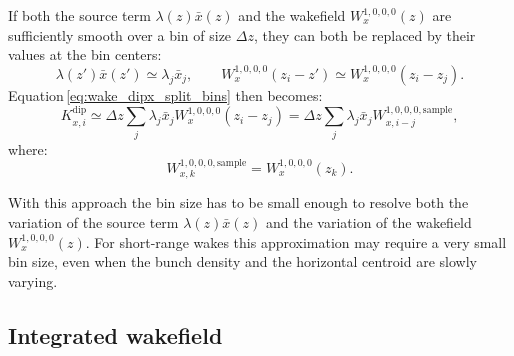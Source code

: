 If both the source term $\lambda(z)\bar{x}(z)$ and the wakefield
$W_x^{1,0,0,0}(z)$ are sufficiently smooth over a bin of size $\Delta z$, they
can both be replaced by their values at the bin centers:
\begin{equation}
    \lambda(z')\bar{x}(z') \simeq \lambda_j\bar{x}_j,\qquad
    W_x^{1,0,0,0}(z_i-z') \simeq W_x^{1,0,0,0}(z_i-z_j).
\end{equation}
Equation\,\eqref{eq:wake_dipx_split_bins} then becomes:
\begin{equation}
    K_{x,i}^\mathrm{dip} \simeq
    \Delta z
    \sum_j
    \lambda_j\bar{x}_j W_x^{1,0,0,0}(z_i-z_j)
    =
    \Delta z
    \sum_j
    \lambda_j\bar{x}_j W_{x,i-j}^{1,0,0,0,\mathrm{sample}},
    \label{eq:wake_dipx_disc_pointwise}
\end{equation}
where:
\begin{equation}
    W_{x,k}^{1,0,0,0,\mathrm{sample}} =
    W_x^{1,0,0,0}(z_k).
\end{equation}

With this approach the bin size has to be small enough to resolve both the
variation of the source term $\lambda(z)\bar{x}(z)$ and the variation of the
wakefield $W_x^{1,0,0,0}(z)$. For short-range wakes this approximation may
require a very small bin size, even when the bunch density and the horizontal
centroid are slowly varying.

\subsection*{Integrated wakefield}

